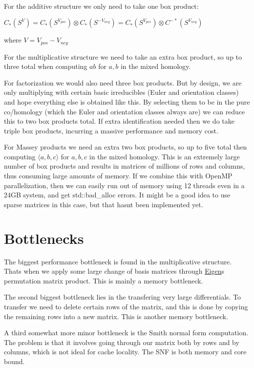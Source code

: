 \begin{DoxyItemize}
\item For the additive structure we only need to take one box product\+:

$C_*(S^V)=C_*(S^{V_{pos}})\otimes C_*(S^{-V_{neg}})=C_*(S^{V_{pos}})\otimes C^{-*}(S^{V_{neg}})$
\end{DoxyItemize}

where $V=V_{pos}-V_{neg}$


\begin{DoxyItemize}
\item For the multiplicative structure we need to take an extra box product, so up to three total when computing $ab$ for $a,b$ in the mixed homology.
\item For factorization we would also need three box products. But by design, we are only multiplying with certain basic irreducibles (Euler and orientation classes) and hope everything else is obtained like this. By selecting them to be in the pure co/homology (which the Euler and orientation classes always are) we can reduce this to two box products total. If extra identification needed then we do take triple box products, incurring a massive performance and memory cost.
\item For Massey products we need an extra two box products, so up to five total then computing $\langle a,b,c\rangle $ for $a,b,c$ in the mixed homology. This is an extremely large number of box products and results in matrices of millions of rows and columns, thus consuming large amounts of memory. If we combine this with Open\+MP parallelization, then we can easily run out of memory using 12 threads even in a 24\+GB system, and get {\ttfamily std\+::bad\+\_\+alloc} errors. It might be a good idea to use sparse matrices in this case, but that hasn\textquotesingle{}t been implemented yet.
\end{DoxyItemize}\hypertarget{perf_bottle}{}\section{Bottlenecks}\label{perf_bottle}

\begin{DoxyItemize}
\item The biggest performance bottleneck is found in the multiplicative structure. That\textquotesingle{}s when we apply some large change of basis matrices through \hyperlink{namespaceEigen}{Eigen}\textquotesingle{}s permutation matrix product. This is mainly a memory bottleneck.
\item The second biggest bottleneck lies in the transfering very large differentials. To transfer we need to delete certain rows of the matrix, and this is done by copying the remaining rows into a new matrix. This is another memory bottleneck.
\item A third somewhat more minor bottleneck is the Smith normal form computation. The problem is that it involves going through our matrix both by rows and by columns, which is not ideal for cache locality. The S\+NF is both memory and core bound. 
\end{DoxyItemize}